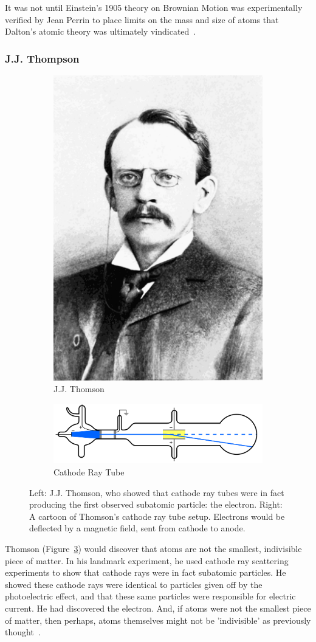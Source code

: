 It was not until Einstein's 1905 theory on Brownian Motion was experimentally
verified by Jean Perrin to place limits on the mass and size of atoms that
Dalton's atomic theory was ultimately vindicated~\cite{Patterson200750}.

\subsubsection{J.J. Thompson}

\begin{figure}[ht]
	\centering
	\begin{subfigure}{.4\textwidth}
		\centering
		\includegraphics[width=0.4\linewidth]{figures/jjthomson.png}
		\caption{J.J. Thomson ~\cite{PopularScience1899}}
		\label{fig:thomsonportrait}
	\end{subfigure}%
	\begin{subfigure}{0.6\textwidth}
		\centering
		\includegraphics[width=0.4\linewidth]{figures/cathoderaytube.png}
		\caption{Cathode Ray Tube ~\cite{Kurzon2010}}
		\label{fig:thomsoncathode}
	\end{subfigure}
	\caption{ 
		Left: J.J. Thomson, who showed that cathode ray tubes were in fact producing
		the first observed subatomic particle: the electron. Right: A cartoon of
		Thomson's cathode ray tube setup. Electrons would be deflected by a magnetic
		field, sent from cathode to anode.
	}
	\label{fig:jjthomson}
\end{figure}

Thomson (Figure~\ref{fig:jjthomson}) would discover that atoms are not the
smallest, indivisible piece of matter. In his landmark experiment, he used
cathode ray scattering experiments to show that cathode rays were in fact
subatomic particles. He showed these cathode rays were identical to particles
given off by the photoelectric effect, and that these same particles were
responsible for electric current. He had discovered the electron. And, if atoms
were not the smallest piece of matter, then perhaps, atoms themselves might not
be 'indivisible' as previously thought~\cite{nobelthomson2014}.

